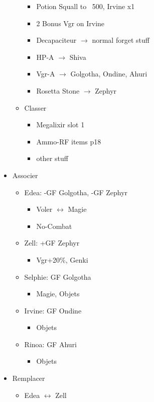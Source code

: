 \begin{menu}
\begin{itemize}
\begin{itemize}
					\begin{itemize}
						\item Potion Squall to ~500, Irvine x1
						\item 2 Bonus Vgr on Irvine
						\item Decapaciteur $\rightarrow$ normal forget stuff
						\item HP-A $\rightarrow$ Shiva
						\item Vgr-A $\rightarrow$ Golgotha, Ondine, Ahuri
						\item Rosetta Stone $\rightarrow$ Zephyr
					\end{itemize}
				\item Classer
					\begin{itemize}
						\item Megalixir slot 1
						\item Ammo-RF items p18
						\item other stuff
					\end{itemize}
			\end{itemize}
		\item Associer
			\begin{itemize}
				\item Edea: -GF Golgotha, -GF Zephyr
					\begin{itemize}
						\item Voler $\leftrightarrow$ Magie
						\item No-Combat
					\end{itemize}
				\item Zell: +GF Zephyr
					\begin{itemize}
						\item Vgr+20\%, Genki
					\end{itemize}
				\item Selphie: GF Golgotha
					\begin{itemize}
						\item Magie, Objets
					\end{itemize}
				\item Irvine: GF Ondine
					\begin{itemize}
						\item Objets
					\end{itemize}
				\item Rinoa: GF Ahuri
					\begin{itemize}
						\item Objets
					\end{itemize}
			\end{itemize}
		\item Remplacer
			\begin{itemize}
				\item Edea $\leftrightarrow$ Zell
			\end{itemize}
	\end{itemize}
\end{menu}

